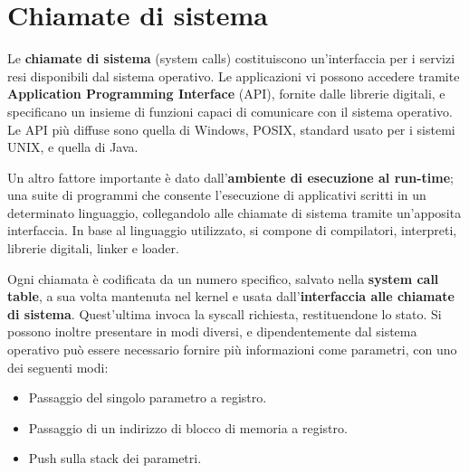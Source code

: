 \section{Chiamate di sistema}
Le \textbf{chiamate di sistema} (system calls) costituiscono un'interfaccia per i servizi resi disponibili dal sistema operativo. Le applicazioni vi possono accedere tramite \textbf{Application Programming Interface} (API), fornite dalle librerie digitali, e specificano un insieme di funzioni capaci di comunicare con il sistema operativo. Le API più diffuse sono quella di Windows, POSIX, standard usato per i sistemi UNIX, e quella di Java.\par
Un altro fattore importante è dato dall'\textbf{ambiente di esecuzione al run-time}; una suite di programmi che consente l'esecuzione di applicativi scritti in un determinato linguaggio, collegandolo alle chiamate di sistema tramite un'apposita interfaccia. In base al linguaggio utilizzato, si compone di compilatori, interpreti, librerie digitali, linker e loader.\par
Ogni chiamata è codificata da un numero specifico, salvato nella \textbf{system call table}, a sua volta mantenuta nel kernel e usata dall'\textbf{interfaccia alle chiamate di sistema}. Quest'ultima invoca la syscall richiesta, restituendone lo stato. Si possono inoltre presentare in modi diversi, e dipendentemente dal sistema operativo può essere necessario fornire più informazioni come parametri, con uno dei seguenti modi: \begin{itemize}
	\item Passaggio del singolo parametro a registro.
	\item Passaggio di un indirizzo di blocco di memoria a registro.
	\item Push sulla stack dei parametri.
\end{itemize}
